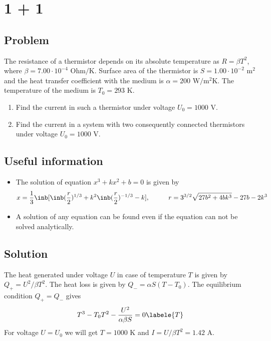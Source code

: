 \section*{1 + 1}

\subsection*{Problem}
The resistance of a thermistor depends on its absolute temperature as
$R = \beta T^2$, where $\beta = 7.00 \cdot 10^{-4}\text{ Ohm/K}$.
Surface area of the thermistor is $S = 1.00 \cdot 10^{-2} \text{ m}^2$ and
the heat transfer coefficient with the medium is $\alpha = 200 \text{ W/m$^2$K}$.
The temperature of the medium is $T_0 = 293 \text{ K}$.

\begin{enumerate}
    \item Find the current in such a thermistor under voltage $U_0 = 1000 \text{ V}$.
    \item Find the current in a system with two consequently connected thermistors
        under voltage $U_0 = 1000 \text{ V}$.
\end{enumerate}

\subsection*{Useful information}
\begin{itemize}
    \item The solution of equation $x^3 + k x^2 + b = 0$ is given by
        \begin{equation}
            x = \frac{1}{3} \inb[{
                \inb({\frac{r}{2}})^{1/3} +
                k^2 \inb({\frac{r}{2}})^{-1/3} - k}], \hspace{1cm}
            r = 3^{3/2} \sqrt{27 b^2 + 4 b k^3} - 27b - 2 k^3
        \end{equation}
    \item A solution of any equation can be found even if
        the equation can not be solved analytically.
\end{itemize}

\subsection*{Solution}

The heat generated under voltage $U$ in case of temperature $T$
is given by $Q_+ = U^2 / \beta T^2$.
The heat loss is given by $Q_- = \alpha S (T - T_0)$.
The equilibrium condition $Q_+ = Q_-$ gives
\begin{equation}
    T^3 - T_0 T^2 - \frac{U^2}{\alpha \beta S} = 0
    \labele{T}
\end{equation}
For voltage $U = U_0$ we will get
$T = 1000 \text{ K}$ and $I = U / \beta T^2 = 1.42 \text{ A}$.

